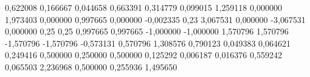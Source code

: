 \expandafter\def\csname dato:Ncerca\endcsname{0{,}622008}
\expandafter\def\csname dato:Nmixto\endcsname{0{,}166667}
\expandafter\def\csname dato:Nlejos\endcsname{0{,}044658}
\expandafter\def\csname dato:sumaNss\endcsname{0{,}663391}
\expandafter\def\csname dato:fe1x\endcsname{0{,}314779}
\expandafter\def\csname dato:fe1y\endcsname{0{,}099015}
\expandafter\def\csname dato:F9\endcsname{1{,}259118}
\expandafter\def\csname dato:F10\endcsname{0{,}000000}
\expandafter\def\csname dato:Fredx\endcsname{1{,}973403}
\expandafter\def\csname dato:Fredy\endcsname{0{,}000000}
\expandafter\def\csname dato:u5\endcsname{0{,}997665}
\expandafter\def\csname dato:v5\endcsname{0{,}000000}
\expandafter\def\csname dato:erru5\endcsname{-0{,}002335}
\expandafter\def\csname dato:erru5pct\endcsname{0{,}23}
\expandafter\def\csname dato:sumaFx\endcsname{3{,}067531}
\expandafter\def\csname dato:sumaFy\endcsname{0{,}000000}
\expandafter\def\csname dato:sumaRx\endcsname{-3{,}067531}
\expandafter\def\csname dato:sumaRy\endcsname{0{,}000000}
\expandafter\def\csname dato:cx\endcsname{0{,}25}
\expandafter\def\csname dato:cy\endcsname{0{,}25}
\expandafter\def\csname dato:gux\endcsname{0{,}997665}
\expandafter\def\csname dato:guy\endcsname{0{,}997665}
\expandafter\def\csname dato:gvx\endcsname{-1{,}000000}
\expandafter\def\csname dato:gvy\endcsname{-1{,}000000}
\expandafter\def\csname dato:eux\endcsname{1{,}570796}
\expandafter\def\csname dato:euy\endcsname{1{,}570796}
\expandafter\def\csname dato:evx\endcsname{-1{,}570796}
\expandafter\def\csname dato:evy\endcsname{-1{,}570796}
\expandafter\def\csname dato:dux\endcsname{-0{,}573131}
\expandafter\def\csname dato:dvx\endcsname{0{,}570796}
\expandafter\def\csname dato:e2c\endcsname{1{,}308576}
\expandafter\def\csname dato:wc\endcsname{0{,}790123}
\expandafter\def\csname dato:dAc\endcsname{0{,}049383}
\expandafter\def\csname dato:cH1c\endcsname{0{,}064621}
\expandafter\def\csname dato:uhc\endcsname{0{,}249416}
\expandafter\def\csname dato:uMc\endcsname{0{,}500000}
\expandafter\def\csname dato:vhc\endcsname{0{,}250000}
\expandafter\def\csname dato:vMc\endcsname{0{,}500000}
\expandafter\def\csname dato:d2c\endcsname{0{,}125292}
\expandafter\def\csname dato:cL2c\endcsname{0{,}006187}
\expandafter\def\csname dato:sL2e1\endcsname{0{,}016376}
\expandafter\def\csname dato:sH1e1\endcsname{0{,}559242}
\expandafter\def\csname dato:totL2\endcsname{0{,}065503}
\expandafter\def\csname dato:totH1\endcsname{2{,}236968}
\expandafter\def\csname dato:totEx\endcsname{0{,}500000}
\expandafter\def\csname dato:L2\endcsname{0{,}255936}
\expandafter\def\csname dato:H1\endcsname{1{,}495650}
